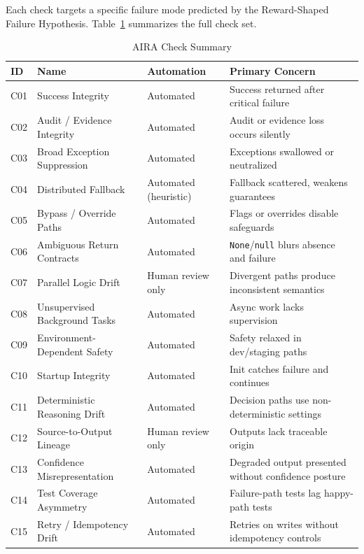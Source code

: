 \documentclass[11pt]{article}
\begin{document}
Each check targets a specific failure mode predicted by the Reward-Shaped Failure Hypothesis.
Table~\ref{tab:checks} summarizes the full check set.

\begin{table}[htbp]
\centering
\caption{AIRA Check Summary}
\label{tab:checks}
\small
\begin{tabularx}{\textwidth}{@{}ll>{\raggedright\arraybackslash}p{3.2cm}>{\raggedright\arraybackslash}X@{}}
\toprule
\textbf{ID} & \textbf{Name} & \textbf{Automation} & \textbf{Primary Concern} \\
\midrule
C01 & Success Integrity & Automated & Success returned after critical failure \\
C02 & Audit / Evidence Integrity & Automated & Audit or evidence loss occurs silently \\
C03 & Broad Exception Suppression & Automated & Exceptions swallowed or neutralized \\
C04 & Distributed Fallback & Automated (heuristic) & Fallback scattered, weakens guarantees \\
C05 & Bypass / Override Paths & Automated & Flags or overrides disable safeguards \\
C06 & Ambiguous Return Contracts & Automated & \texttt{None}/\texttt{null} blurs absence and failure \\
C07 & Parallel Logic Drift & Human review only & Divergent paths produce inconsistent semantics \\
C08 & Unsupervised Background Tasks & Automated & Async work lacks supervision \\
C09 & Environment-Dependent Safety & Automated & Safety relaxed in dev/staging paths \\
C10 & Startup Integrity & Automated & Init catches failure and continues \\
C11 & Deterministic Reasoning Drift & Automated & Decision paths use non-deterministic settings \\
C12 & Source-to-Output Lineage & Human review only & Outputs lack traceable origin \\
C13 & Confidence Misrepresentation & Automated & Degraded output presented without confidence posture \\
C14 & Test Coverage Asymmetry & Automated & Failure-path tests lag happy-path tests \\
C15 & Retry / Idempotency Drift & Automated & Retries on writes without idempotency controls \\
\bottomrule
\end{tabularx}
\end{table}
\end{document}
